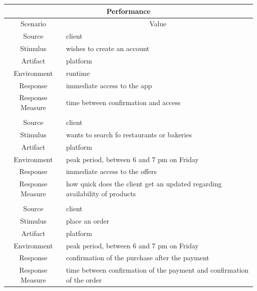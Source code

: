 \begin{table}[H]
    \begin{tabularx}{\textwidth}{|c|X|}
        \hline
        \multicolumn{2}{c}{\textbf{Performance}} \\
        \hline
        \toprule
        \multicolumn{1}{c}{Scenario} & \multicolumn{1}{c}{Value} \\
        \midrule
        Source & \gls{client}  \\
        Stimulus & wishes to create an account \\
        Artifact & platform \\
        Environment & runtime \\
        Response & immediate access to the app \\
        Response Measure & time between confirmation and access \\
         & \\
        Source & \gls{client}  \\
        Stimulus & wants to search fo restaurants or bakeries \\
        Artifact & platform \\
        Environment & peak period, between 6 and 7 pm on Friday \\
        Response & immediate access to the offers \\
        Response Measure & how quick does the \gls{client}  get an updated regarding availability of products \\
        & \\
        Source & \gls{client}  \\
        Stimulus & place an order \\
        Artifact & platform \\
        Environment & peak period, between 6 and 7 pm on Friday \\
        Response & confirmation of the purchase after the payment \\
        Response Measure & time between confirmation of the payment and confirmation of the order \\
        \bottomrule
    \end{tabularx}
\end{table}


